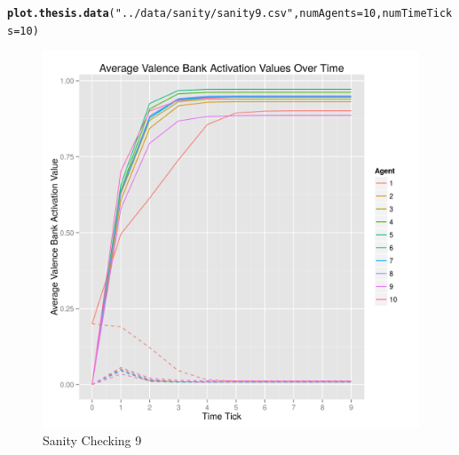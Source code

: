 \documentclass{article}\usepackage[]{graphicx}\usepackage[]{color}
\makeatletter
\def\maxwidth{ %
  \ifdim\Gin@nat@width>\linewidth
    \linewidth
  \else
    \Gin@nat@width
  \fi
}
\newcommand{\hlnum}[1]{\textcolor[rgb]{0.686,0.059,0.569}{#1}}%
\newcommand{\hlstr}[1]{\textcolor[rgb]{0.192,0.494,0.8}{#1}}%
\newcommand{\hlstd}[1]{\textcolor[rgb]{0.345,0.345,0.345}{#1}}%
\newcommand{\hlkwc}[1]{\textcolor[rgb]{0.333,0.667,0.333}{#1}}%
\newcommand{\hlkwd}[1]{\textcolor[rgb]{0.737,0.353,0.396}{\textbf{#1}}}%
\newenvironment{kframe}{%
 \def\at@end@of@kframe{}%
 \ifinner\ifhmode%
  \def\at@end@of@kframe{\end{minipage}}%
  \begin{minipage}{\columnwidth}%
 \fi\fi%
 \def\FrameCommand##1{\hskip\@totalleftmargin \hskip-\fboxsep
 \colorbox{shadecolor}{##1}\hskip-\fboxsep
     \hskip-\linewidth \hskip-\@totalleftmargin \hskip\columnwidth}%
 \MakeFramed {\advance\hsize-\width
   \@totalleftmargin\z@ \linewidth\hsize
   \@setminipage}}%
 {\par\unskip\endMakeFramed%
 \at@end@of@kframe}
\newenvironment{knitrout}{}{} %
\makeatother
\begin{document}
\begin{knitrout}
\color{fgcolor}\begin{kframe}
\begin{alltt}
\hlkwd{plot.thesis.data}\hlstd{(}\hlstr{"../data/sanity/sanity9.csv"}\hlstd{,} \hlkwc{numAgents} \hlstd{=} \hlnum{10}\hlstd{,} \hlkwc{numTimeTicks} \hlstd{=} \hlnum{10}\hlstd{)}
\end{alltt}
\end{kframe}\begin{figure}[]

\includegraphics[width=\maxwidth]{figure/plot-sanity-9} \caption[Sanity Checking 9]{Sanity Checking 9\label{fig:plot-sanity-9}}
\end{figure}


\end{knitrout}

%
%
\end{document}
